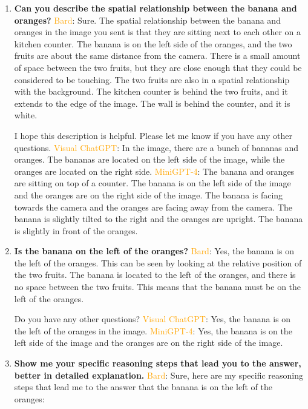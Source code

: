    \begin{enumerate}
        \item \textbf{Can you describe the spatial relationship between the banana and oranges?}
        \subitem 
        \textcolor{orange}{Bard}: Sure. The spatial relationship between the banana and oranges in the image you sent is that they are sitting next to each other on a kitchen counter. The banana is on the left side of the oranges, and the two fruits are about the same distance from the camera. There is a small amount of space between the two fruits, but they are close enough that they could be considered to be touching.
        The two fruits are also in a spatial relationship with the background. The kitchen counter is behind the two fruits, and it extends to the edge of the image. The wall is behind the counter, and it is white.

        I hope this description is helpful. Please let me know if you have any other questions.
        \subitem \textcolor{orange}{Visual ChatGPT}: In the image, there are a bunch of bananas and oranges. The bananas are located on the left side of the image, while the oranges are located on the right side.
        \subitem \textcolor{orange}{MiniGPT-4}: The banana and oranges are sitting on top of a counter. The banana is on the left side of the image and the oranges are on the right side of the image. The banana is facing towards the camera and the oranges are facing away from the camera. The banana is slightly tilted to the right and the oranges are upright. The banana is slightly in front of the oranges.
        \item \textbf{Is the banana on the left of the oranges?}
        \subitem \textcolor{orange}{Bard}:
        Yes, the banana is on the left of the oranges. This can be seen by looking at the relative position of the two fruits. The banana is located to the left of the oranges, and there is no space between the two fruits. This means that the banana must be on the left of the oranges.
        
        Do you have any other questions?
        \subitem \textcolor{orange}{Visual ChatGPT}: Yes, the banana is on the left of the oranges in the image.
        \subitem \textcolor{orange}{MiniGPT-4}: Yes, the banana is on the left side of the image and the oranges are on the right side of the image.
        \item \textbf{Show me your specific reasoning steps that lead you to the answer, better in detailed explanation.}
        \subitem \textcolor{orange}{Bard}: Sure, here are my specific reasoning steps that lead me to the answer that the banana is on the left of the oranges:


\end{enumerate}
